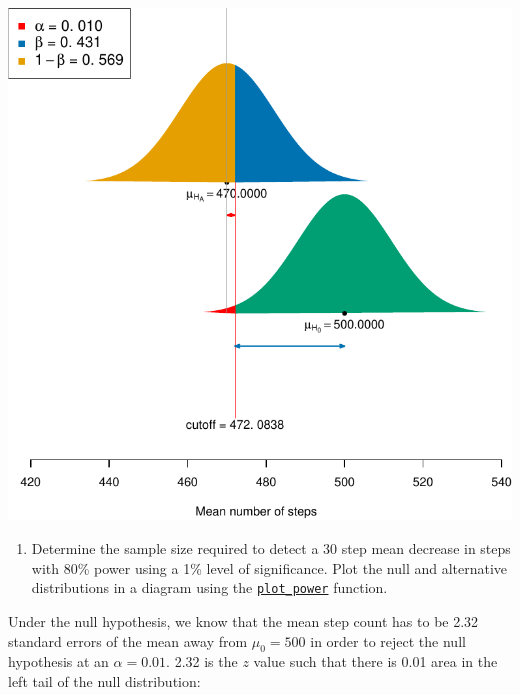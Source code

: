 \documentclass[letterpaper,11pt,twoside,]{pinp}
\providecommand{\tightlist}{%
  \setlength{\itemsep}{0pt}\setlength{\parskip}{0pt}}
\begin{document}
\begin{center}\includegraphics{006-power-solutions_files/figure-latex/unnamed-chunk-11-1} \end{center}

\begin{enumerate}
\def\labelenumi{\alph{enumi}.}
\setcounter{enumi}{2}
\tightlist
\item
  Determine the sample size required to detect a 30 step mean decrease
  in steps with 80\% power using a 1\% level of significance. Plot the
  null and alternative distributions in a diagram using the
  \href{https://raw.githubusercontent.com/sahirbhatnagar/EPIB607/master/inst/code/plot_null_alt.R}{\texttt{plot\_power}}
  function.
\end{enumerate}

Under the null hypothesis, we know that the mean step count has to be
2.32 standard errors of the mean away from \(\mu_0=500\) in order to
reject the null hypothesis at an \(\alpha=0.01\). 2.32 is the \(z\)
value such that there is 0.01 area in the left tail of the null
distribution:

\begin{Shaded}
\begin{Highlighting}[]
\NormalTok{(} \NormalTok{, } \NormalTok{)}
\end{Highlighting}
\end{Shaded}
\end{document}
